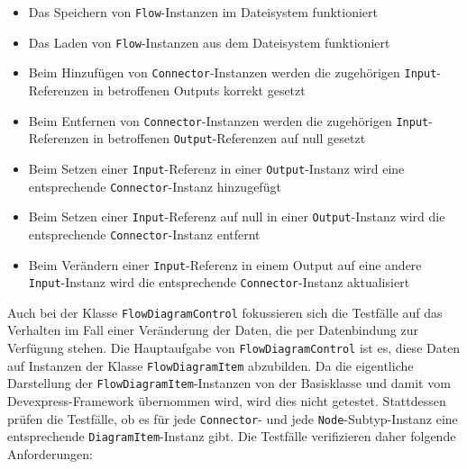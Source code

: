 \begin{itemize}
\item Das Speichern von \texttt{Flow}-Instanzen im Dateisystem funktioniert
\item Das Laden von \texttt{Flow}-Instanzen aus dem Dateisystem funktioniert
\item Beim Hinzufügen von \texttt{Connector}-Instanzen werden die zugehörigen \texttt{Input}-Referenzen in betroffenen Outputs korrekt gesetzt
\item Beim Entfernen von \texttt{Connector}-Instanzen werden die zugehörigen \texttt{Input}-Re\-fe\-ren\-zen in betroffenen \texttt{Output}-Referenzen auf null gesetzt
\item Beim Setzen einer \texttt{Input}-Referenz in einer \texttt{Output}-Instanz wird eine entsprechende \texttt{Connector}-Instanz hinzugefügt
\item Beim Setzen einer \texttt{Input}-Referenz auf null in einer \texttt{Output}-Instanz wird die entsprechende \texttt{Connector}-Instanz entfernt
\item Beim Verändern einer \texttt{Input}-Referenz in einem Output auf eine andere \texttt{Input}-Instanz wird die entsprechende \texttt{Connector}-Instanz aktualisiert 
\end{itemize}

Auch bei der Klasse \texttt{FlowDiagramControl} fokussieren sich die Testfälle auf das Verhalten im Fall einer Veränderung der Daten, die per Datenbindung zur Verfügung stehen. Die Hauptaufgabe von \texttt{FlowDiagramControl} ist es, diese Daten auf Instanzen der Klasse \texttt{FlowDiagramItem} abzubilden. Da die eigentliche Darstellung der \texttt{FlowDiagramItem}-Instanzen von der Basisklasse und damit vom Devexpress-Framework übernommen wird, wird dies nicht getestet. Stattdessen prüfen die Testfälle, ob es für jede \texttt{Connector}- und jede \texttt{Node}-Subtyp-Instanz eine entsprechende \texttt{DiagramItem}-Instanz gibt. Die Testfälle verifizieren daher folgende Anforderungen:

